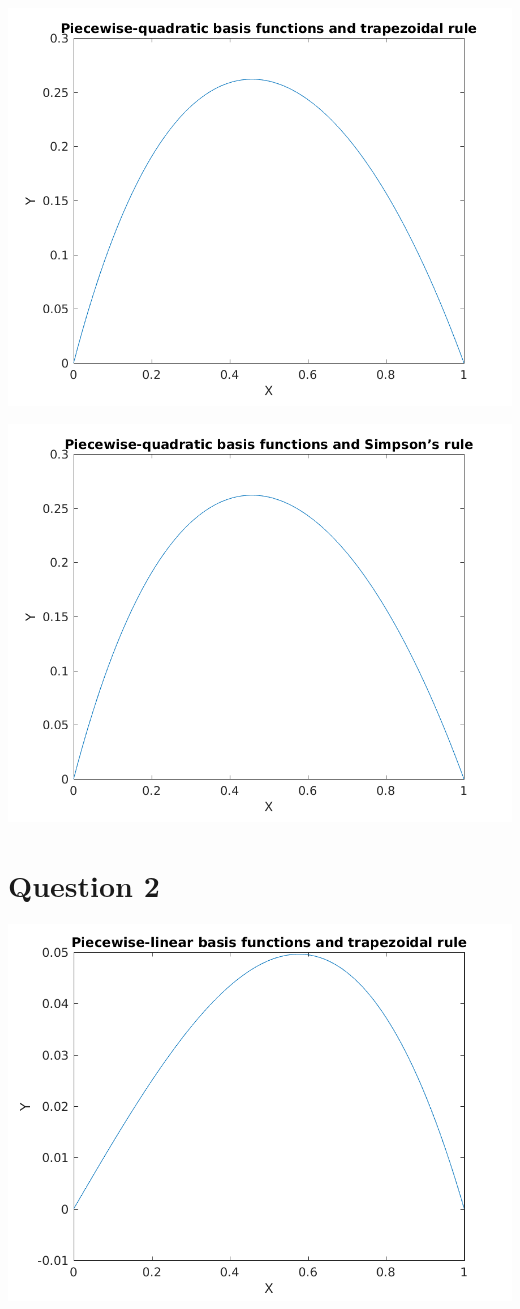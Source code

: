 \documentclass{article}
\begin{document}
\includegraphics{"q1_3"}
\pagebreak


\includegraphics{"q1_4"}
\pagebreak

\section{Question 2}

\includegraphics{"q2_1"}
\pagebreak
\end{document}
